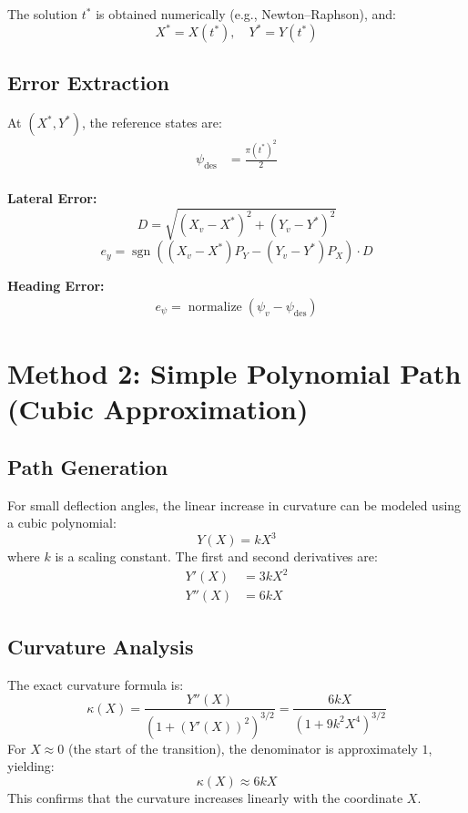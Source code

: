\documentclass{article}
\begin{document}
The solution $t^*$ is obtained numerically (e.g., Newton–Raphson), and:
\[
X^* = X(t^*), \quad Y^* = Y(t^*)
\]


\subsection{Error Extraction}
At $(X^*, Y^*)$, the reference states are:
\begin{align}
\psi_{\mathrm{des}} &= \frac{\pi (t^*)^2}{2} \\
\end{align}

\textbf{Lateral Error:}
\begin{equation}
    D= \sqrt{(X_v - X^*)^2 + (Y_v - Y^*)^2}
\end{equation}
\begin{equation}    
    e_y = \operatorname{sgn} \left( (X_v - X^*)P_Y - (Y_v - Y^*)P_X \right) \cdot D
\end{equation}


\textbf{Heading Error:}
\begin{align}
e_\psi = \operatorname{normalize}(\psi_v - \psi_{\mathrm{des}})
\end{align}






\section{Method 2: Simple Polynomial Path (Cubic Approximation)}

\subsection{Path Generation}
For small deflection angles, the linear increase in curvature can be modeled using a cubic polynomial:
\begin{equation}
Y(X) = k X^3
\end{equation}
where $k$ is a scaling constant. The first and second derivatives are:
\begin{align}
Y'(X) &= 3k X^2 \\
Y''(X) &= 6k X
\end{align}

\subsection{Curvature Analysis}
The exact curvature formula is:
\begin{equation}
\kappa(X) = \frac{Y''(X)}{\left(1 + (Y'(X))^2\right)^{3/2}} = \frac{6kX}{\left(1 + 9k^2 X^4\right)^{3/2}}
\end{equation}
For $X \approx 0$ (the start of the transition), the denominator is approximately $1$, yielding:
\begin{equation}
\kappa(X) \approx 6kX
\end{equation}
This confirms that the curvature increases linearly with the coordinate $X$.
\end{document}
